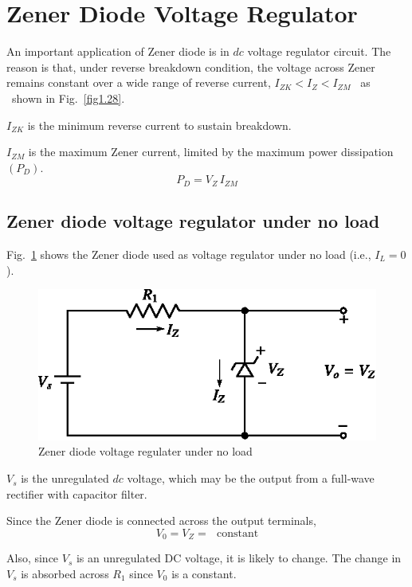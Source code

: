 \section{Zener Diode Voltage Regulator}\label{sec2.28}

An important application of Zener diode is in $dc$ voltage regulator circuit. The reason is that, under reverse breakdown condition, the voltage across Zener remains constant over a wide range of reverse current, $I_{ZK}<I_{Z}<I_{ZM}$ \ as \ shown in Fig.~\ref{fig1.28}.

$I_{ZK}$ is the minimum reverse current to sustain breakdown.

$I_{ZM}$ is the maximum Zener current, limited by the maximum power dissipation $(P_{D})$.
$$
P_{D}=V_{Z}\,I_{ZM}
$$

\subsection{Zener diode voltage regulator under no load}\label{sec2.28.1}

Fig.~\ref{fig2.23} shows the Zener diode used as voltage regulator under no load (i.e., $I_{L}=0$).
\begin{figure}[H]
\centering
\includegraphics{chap2/fig2.23.eps}
\caption{Zener diode voltage regulater under no load}\label{fig2.23}
\end{figure}

$V_{s}$ is the unregulated $dc$ voltage, which may be the output from a full-wave rectifier with capacitor filter. 

Since the Zener diode is connected across the output terminals,
\begin{equation}
V_{0}=V_{Z}=\text{~ constant}\label{eq2.78}
\end{equation}

Also, since $V_{s}$ is an unregulated DC voltage, it is likely to change. The change in $V_{s}$ is absorbed across $R_{1}$ since $V_{0}$ is a constant.

